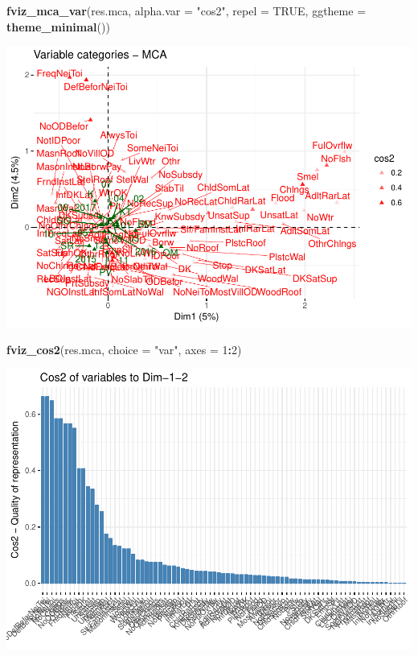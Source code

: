 \documentclass[11pt,]{article}
\newenvironment{Shaded}{\begin{snugshade}}{\end{snugshade}}
\newcommand{\DataTypeTok}[1]{\textcolor[rgb]{0.13,0.29,0.53}{#1}}
\newcommand{\DecValTok}[1]{\textcolor[rgb]{0.00,0.00,0.81}{#1}}
\newcommand{\KeywordTok}[1]{\textcolor[rgb]{0.13,0.29,0.53}{\textbf{#1}}}
\newcommand{\NormalTok}[1]{#1}
\newcommand{\OperatorTok}[1]{\textcolor[rgb]{0.81,0.36,0.00}{\textbf{#1}}}
\newcommand{\OtherTok}[1]{\textcolor[rgb]{0.56,0.35,0.01}{#1}}
\newcommand{\StringTok}[1]{\textcolor[rgb]{0.31,0.60,0.02}{#1}}
\begin{document}
\begin{Shaded}
\begin{Highlighting}[]
\KeywordTok{fviz_mca_var}\NormalTok{(res.mca, }\DataTypeTok{alpha.var =} \StringTok{"cos2"}\NormalTok{,}
             \DataTypeTok{repel =} \OtherTok{TRUE}\NormalTok{,}
             \DataTypeTok{ggtheme =} \KeywordTok{theme_minimal}\NormalTok{())}
\end{Highlighting}
\end{Shaded}

\includegraphics{describe_FSMintentions_regional_seasonal_iDE-Camb_surveysOct2017_files/figure-latex/MCA_results-8.pdf}

\begin{Shaded}
\begin{Highlighting}[]
\KeywordTok{fviz_cos2}\NormalTok{(res.mca, }\DataTypeTok{choice =} \StringTok{"var"}\NormalTok{, }\DataTypeTok{axes =} \DecValTok{1}\OperatorTok{:}\DecValTok{2}\NormalTok{)}
\end{Highlighting}
\end{Shaded}

\includegraphics{describe_FSMintentions_regional_seasonal_iDE-Camb_surveysOct2017_files/figure-latex/MCA_results-9.pdf}
\end{document}
